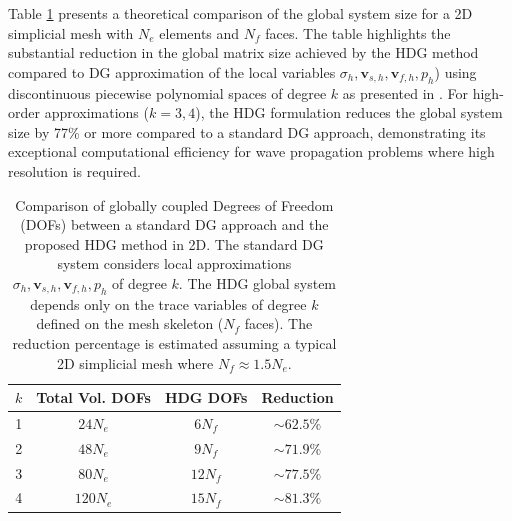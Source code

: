 \documentclass[10pt,letterpaper]{amsart}
\theoremstyle{plain} %
\theoremstyle{remark} %
\newcommand{\vect}[1]{\mathbf{#1}}
\begin{document}
Table \ref{tab:dof_comparison} presents a theoretical comparison of the global system size for a 2D simplicial mesh with $N_e$ elements and $N_f$ faces. The table highlights the substantial reduction in the global matrix size achieved by the HDG method compared to DG approximation of the local variables $\sigma_h, \vect{v}_{s,h}, \vect{v}_{f,h}, p_h$) using discontinuous piecewise polynomial spaces of degree $k$ as presented in \cite{laPuente-Dumbser-Kaser-Igel:2008}. For high-order approximations ($k=3, 4$), the HDG formulation reduces the global system size by 77\% or more compared to a standard DG approach, demonstrating its exceptional computational efficiency for wave propagation problems where high resolution is required.

\begin{table}[htpb]
    \centering
    \renewcommand{\arraystretch}{1.2}
    \caption{Comparison of globally coupled Degrees of Freedom (DOFs) between a standard DG approach and the proposed HDG method in 2D. The standard DG system considers local approximations $\sigma_h, \vect{v}_{s,h}, \vect{v}_{f,h}, p_h$  of degree $k$. The HDG global system depends only on the trace variables of degree $k$ defined on the mesh skeleton ($N_f$ faces). The reduction percentage is estimated assuming a typical 2D simplicial mesh where $N_f \approx 1.5 N_e$.}
    \begin{tabular}{c c c c}
        \toprule
        $k$ & Total Vol. DOFs & HDG DOFs & Reduction \\
        \midrule
        1 & $24 N_e$  & $6 N_f$  & $\sim 62.5\%$ \\
        2 & $48 N_e$  & $9 N_f$  & $\sim 71.9\%$ \\
        3 & $80 N_e$  & $12 N_f$ & $\sim 77.5\%$ \\
        4 & $120 N_e$ & $15 N_f$ & $\sim 81.3\%$ \\
        \bottomrule
    \end{tabular}
    \label{tab:dof_comparison}
\end{table}
\end{document}
